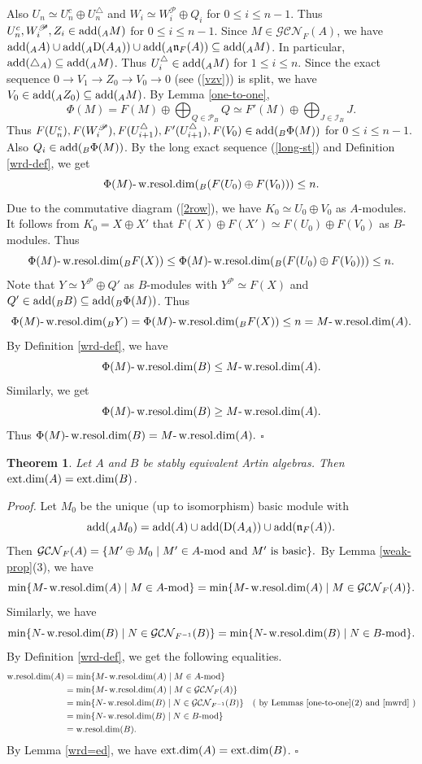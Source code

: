 \documentclass[12pt]{article}
\numberwithin{equation}{section}
\newtheorem{Theo}[Def]{Theorem}
\theoremstyle{definition}
\newcommand{\add}{{\rm add}}
\def\ed{\mathop{\rm ext.dim}\nolimits}
\def\wrd{\mathop{\rm w.resol.dim}\nolimits}
\newcommand{\DD}{{\rm D}}
\newcommand{\modcat}{\ensuremath{\mbox{{\rm -mod}}}}
\newcommand{\ra}{\rightarrow}
\begin{document}
Also $U_n\simeq U_n^{c}\oplus U_n^{\triangle}$ and $W_i\simeq W_i^{\mathscr{P}}\oplus Q_i$ for $0\le i\le n-1$.
Thus $U_n^{c},W_i^{\mathscr{P}},Z_i\in \add(_AM)$ for $0\le i\le n-1$. Since $M\in \mathcal{GCN}_{F}(A)$, we have $\add(_AA)\cup \add(_A\DD(A_A))\cup\add(_A\mathfrak{n}_{F}(A))\subseteq\add(_AM)$.
In particular, $\add(\bigtriangleup_A)\subseteq \add(_AM)$.
Thus $U^{\triangle}_i\in \add(_AM)$ for $1\le i\le n$.
Since the exact sequence $0\ra V_1\ra Z_0\ra V_0\ra 0$ (see (\ref{vzv})) is split, we have $V_0\in \add(_AZ_0)\subseteq \add(_AM)$.
By Lemma \ref{one-to-one}, $$\Phi(M)=F(M)\oplus\bigoplus_{Q\in \mathscr{P}_B}Q\simeq F'(M)\oplus \bigoplus_{J\in\mathscr{I}_B}J.$$
Thus $F(U_n^{c}),F(W_i^{\mathscr{P}}),F(U^{\triangle}_{i+1}),F'(U^{\triangle}_{i+1}),F(V_0)\in \add(_B\Phi(M))$ for $0\le i\le n-1$.
Also $Q_i\in \add(_B\Phi(M))$.
By the long exact sequence (\ref{long-st}) and Definition \ref{wrd-def}, we get $$\Phi(M)\mbox{-}\wrd(_B(F(U_0)\oplus F(V_0)))\le n.$$
Due to the commutative diagram (\ref{2row}), we have $K_0\simeq U_0\oplus V_0$ as $A$-modules.
It follows from $K_0=X\oplus X'$ that $F(X)\oplus F(X')\simeq F(U_0)\oplus F(V_0)$ as $B$-modules.
Thus $$\Phi(M)\mbox{-}\wrd(_BF(X))\le \Phi(M)\mbox{-}\wrd(_B(F(U_0)\oplus F(V_0)))\le n.$$
Note that $Y\simeq Y^{\mathscr{P}}\oplus Q'$ as $B$-modules with $Y^{\mathscr{P}}\simeq F(X)$ and $Q'\in \add(_BB)\subseteq \add(_B\Phi(M))$.
Thus $$\Phi(M)\mbox{-}\wrd(_BY)=\Phi(M)\mbox{-}\wrd(_BF(X))\le n= M\mbox{-}\wrd(A).$$
By Definition \ref{wrd-def}, we have $$\Phi(M)\mbox{-}\wrd(B)\le M\mbox{-}\wrd(A).$$ Similarly, we get $$\Phi(M)\mbox{-}\wrd(B)\ge M\mbox{-}\wrd(A).$$ Thus $\Phi(M)\mbox{-}\wrd(B)= M\mbox{-}\wrd(A).$
$\square$

\begin{Theo}\label{st-thm}
Let $A$ and $B$ be stably equivalent Artin algebras. Then $\ed(A)=\ed(B)$.
\end{Theo}
{\it Proof.} Let $M_0$ be the unique (up to isomorphism) basic module with $$\add(_AM_0)=\add(A)\cup\add(\DD(A_A))\cup\add(\mathfrak{n}_{F}(A)).$$
Then $\mathcal{GCN}_{F}(A)=\{M'\oplus M_0\mid M'\in A\modcat \mbox{ and }M' \mbox{ is basic} \}.$
By Lemma \ref{weak-prop}(3), we have
$$\min\{M \mbox{-}\wrd(A)\mid M\in A\modcat\}
=\min\{M \mbox{-}\wrd(A)\mid M\in\mathcal{GCN}_{F}(A)\}.$$
Similarly, we have
$$\min\{N \mbox{-}\wrd(B)\mid N\in \mathcal{GCN}_{F^{-1}}(B)\}
=\min\{N \mbox{-}\wrd(B)\mid N\in B\modcat\}.$$
By Definition \ref{wrd-def}, we get the following equalities.
\begin{align*}
\wrd(A)
&=\min\{M \mbox{-}\wrd(A)\mid M\in A\modcat\}\\
&=\min\{M \mbox{-}\wrd(A)\mid M\in \mathcal{GCN}_{F}(A)\}\\
&=\min\{N \mbox{-}\wrd(B)\mid N\in \mathcal{GCN}_{F^{-1}}(B)\}
\quad (\mbox{ by Lemmas \ref{one-to-one}(2) and \ref{mwrd} })\\
&=\min\{N \mbox{-}\wrd(B)\mid N\in B\modcat\}\\
&=\wrd(B).
\end{align*}
By Lemma \ref{wrd=ed}, we have $\ed(A)=\ed(B)$.
$\square$
\end{document}
